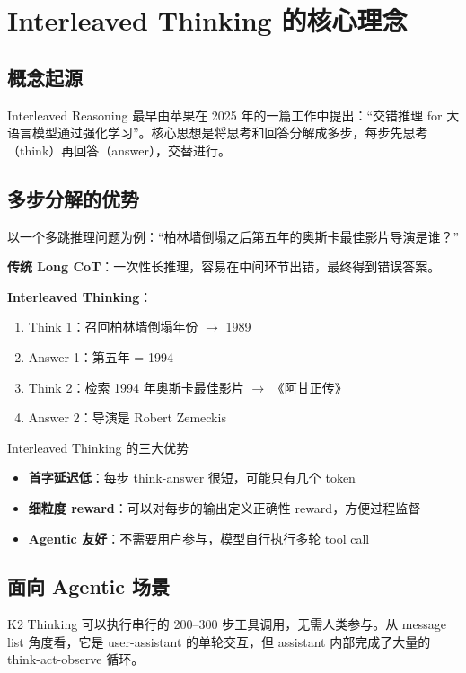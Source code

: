 \section{Interleaved Thinking 的核心理念}

\subsection{概念起源}

Interleaved Reasoning 最早由苹果在 2025 年的一篇工作中提出：``交错推理 for 大语言模型通过强化学习''。核心思想是将思考和回答分解成多步，每步先思考（think）再回答（answer），交替进行。

\subsection{多步分解的优势}

以一个多跳推理问题为例：``柏林墙倒塌之后第五年的奥斯卡最佳影片导演是谁？''

\textbf{传统 Long CoT}：一次性长推理，容易在中间环节出错，最终得到错误答案。

\textbf{Interleaved Thinking}：
\begin{enumerate}
  \item Think 1：召回柏林墙倒塌年份 $\to$ 1989
  \item Answer 1：第五年 = 1994
  \item Think 2：检索 1994 年奥斯卡最佳影片 $\to$ 《阿甘正传》
  \item Answer 2：导演是 Robert Zemeckis
\end{enumerate}

\begin{importantbox}{Interleaved Thinking 的三大优势}
\begin{itemize}
  \item \textbf{首字延迟低}：每步 think-answer 很短，可能只有几个 token
  \item \textbf{细粒度 reward}：可以对每步的输出定义正确性 reward，方便过程监督
  \item \textbf{Agentic 友好}：不需要用户参与，模型自行执行多轮 tool call
\end{itemize}
\end{importantbox}

\subsection{面向 Agentic 场景}

K2 Thinking 可以执行串行的 200--300 步工具调用，无需人类参与。从 message list 角度看，它是 user-assistant 的单轮交互，但 assistant 内部完成了大量的 think-act-observe 循环。

